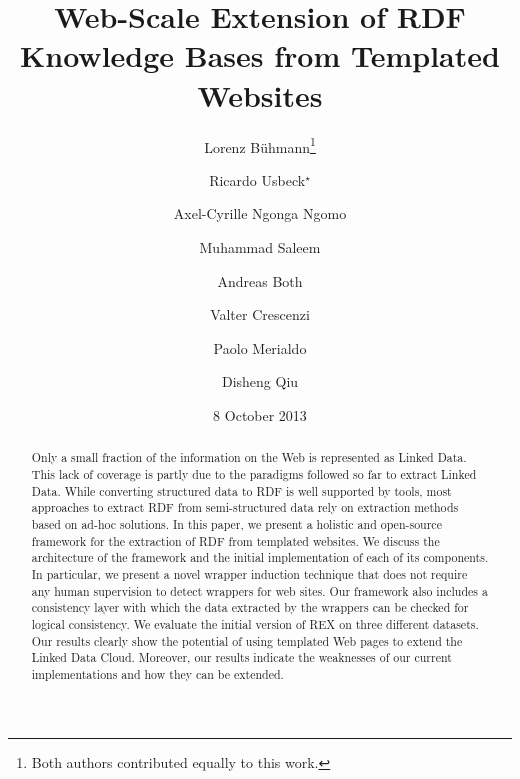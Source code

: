 \documentclass{llncs}
\begin{document}
 

\title{Web-Scale Extension of RDF Knowledge Bases from Templated Websites}

\author{
Lorenz B\"uhmann\thanks{Both authors contributed equally to this work.} \and 
Ricardo Usbeck$^\star$\and
Axel-Cyrille Ngonga Ngomo \and 
Muhammad Saleem  \and
Andreas Both \and
Valter Crescenzi \and       
Paolo Merialdo\and
Disheng Qiu
}

\date{8 October 2013}

\maketitle
\begin{abstract}
Only a small fraction of the information on the Web is represented as Linked Data.
This lack of coverage is partly due to the paradigms followed so far to extract Linked Data. 
While converting structured data to RDF is well supported by tools, most approaches to extract RDF from semi-structured data rely on extraction methods based on ad-hoc solutions. 
In this paper, we present a holistic and open-source framework for the extraction of RDF from templated websites.
We discuss the architecture of the framework and the initial implementation of each of its components.
In particular, we present a novel wrapper induction technique that does not require any human supervision to detect wrappers for web sites. 
Our framework also includes a consistency layer with which the data extracted by the wrappers can be checked for logical consistency.
We evaluate the initial version of REX on three different datasets. 
Our results clearly show the potential of using templated Web pages to extend the Linked Data Cloud.
Moreover, our results indicate the weaknesses of our current implementations and how they can be extended.
\end{abstract}
\end{document}
